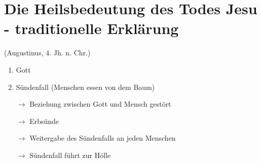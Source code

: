 \documentclass[12pt,a4paper]{report}
\begin{document}
	\section{Die Heilsbedeutung des Todes Jesu - traditionelle Erklärung}
	(Augustinus, 4. Jh. n. Chr.) \\
	\begin{enumerate}
		\item Gott
		\item Sündenfall (Menschen essen von dem Baum)
		\item[$\to$]Beziehung zwischen Gott und Mensch gestört
		\item[$\to$]\dq Erbsünde\dq
		\item[$\to$] Weitergabe des Sündenfalls an jeden Menschen
		\item[$\to$] Sündenfall führt zur Hölle 
		
	\end{enumerate}
\end{document}
